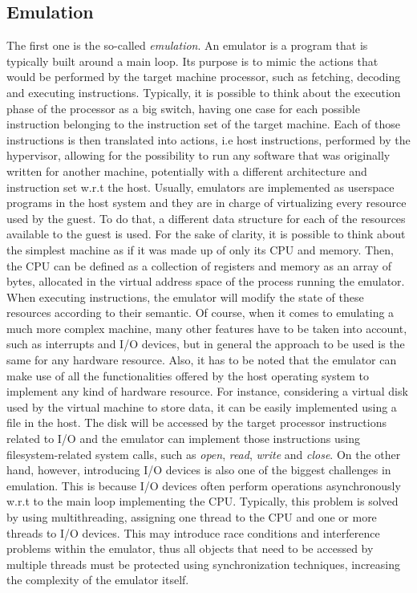 \subsection{Emulation} \label{sec:emul}
The first one is the so-called \emph{emulation}. An emulator is a program that is typically built around a main loop. Its purpose is to mimic the actions that would be performed by the target machine processor, such as fetching, decoding and executing instructions. Typically, it is possible to think about the execution phase of the processor as a big switch, having one case for each possible instruction belonging to the instruction set of the target machine. Each of those instructions is then translated into actions, i.e host instructions, performed by the hypervisor, allowing for the possibility to run any software that was originally written for another machine, potentially with a different architecture and instruction set w.r.t the host. Usually, emulators are implemented as userspace programs in the host system and they are in charge of virtualizing every resource used by the guest. To do that, a different data structure for each of the resources available to the guest is used. For the sake of clarity, it is possible to think about the simplest machine as if it was made up of only its CPU and memory. Then, the CPU can be defined as a collection of registers and memory as an array of bytes, allocated in the virtual address space of the process running the emulator. When executing instructions, the emulator will modify the state of these resources according to their semantic. Of course, when it comes to emulating a much more complex machine, many other features have to be taken into account, such as interrupts and I/O devices, but in general the approach to be used is the same for any hardware resource. Also, it has to be noted that the emulator can make use of all the functionalities offered by the host operating system to implement any kind of hardware resource. For instance, considering a virtual disk used by the virtual machine to store data, it can be easily implemented using a file in the host. The disk will be accessed by the target processor instructions related to I/O and the emulator can implement those instructions using filesystem-related system calls, such as \emph{open}, \emph{read}, \emph{write} and \emph{close}. On the other hand, however, introducing I/O devices is also one of the biggest challenges in emulation. This is because I/O devices often perform operations asynchronously w.r.t to the main loop implementing the CPU. Typically, this problem is solved by using multithreading, assigning one thread to the CPU and one or more threads to I/O devices. This may introduce race conditions and interference problems within the emulator, thus all objects that need to be accessed by multiple threads must be protected using synchronization techniques, increasing the complexity of the emulator itself.
